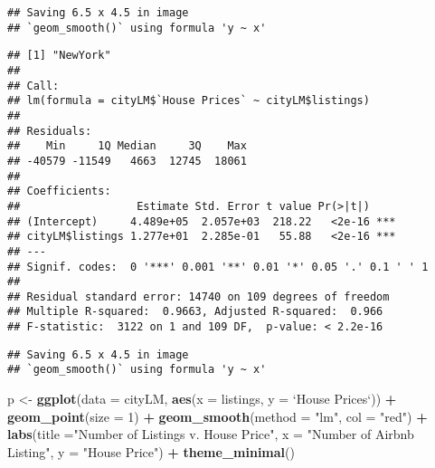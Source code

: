 \documentclass[
]{article}
\newenvironment{Shaded}{\begin{snugshade}}{\end{snugshade}}
\newcommand{\DataTypeTok}[1]{\textcolor[rgb]{0.13,0.29,0.53}{#1}}
\newcommand{\DecValTok}[1]{\textcolor[rgb]{0.00,0.00,0.81}{#1}}
\newcommand{\KeywordTok}[1]{\textcolor[rgb]{0.13,0.29,0.53}{\textbf{#1}}}
\newcommand{\NormalTok}[1]{#1}
\newcommand{\OperatorTok}[1]{\textcolor[rgb]{0.81,0.36,0.00}{\textbf{#1}}}
\newcommand{\StringTok}[1]{\textcolor[rgb]{0.31,0.60,0.02}{#1}}
\begin{document}
\begin{verbatim}
## Saving 6.5 x 4.5 in image
## `geom_smooth()` using formula 'y ~ x'
\end{verbatim}

\begin{verbatim}
## [1] "NewYork"
## 
## Call:
## lm(formula = cityLM$`House Prices` ~ cityLM$listings)
## 
## Residuals:
##    Min     1Q Median     3Q    Max 
## -40579 -11549   4663  12745  18061 
## 
## Coefficients:
##                  Estimate Std. Error t value Pr(>|t|)    
## (Intercept)     4.489e+05  2.057e+03  218.22   <2e-16 ***
## cityLM$listings 1.277e+01  2.285e-01   55.88   <2e-16 ***
## ---
## Signif. codes:  0 '***' 0.001 '**' 0.01 '*' 0.05 '.' 0.1 ' ' 1
## 
## Residual standard error: 14740 on 109 degrees of freedom
## Multiple R-squared:  0.9663, Adjusted R-squared:  0.966 
## F-statistic:  3122 on 1 and 109 DF,  p-value: < 2.2e-16
\end{verbatim}

\begin{verbatim}
## Saving 6.5 x 4.5 in image
## `geom_smooth()` using formula 'y ~ x'
\end{verbatim}

\begin{Shaded}
\begin{Highlighting}[]
\NormalTok{p <-}\StringTok{ }\KeywordTok{ggplot}\NormalTok{(}\DataTypeTok{data =}\NormalTok{ cityLM, }\KeywordTok{aes}\NormalTok{(}\DataTypeTok{x =}\NormalTok{ listings, }\DataTypeTok{y =} \StringTok{`}\DataTypeTok{House Prices}\StringTok{`}\NormalTok{)) }\OperatorTok{+}
\StringTok{  }\KeywordTok{geom_point}\NormalTok{(}\DataTypeTok{size =} \DecValTok{1}\NormalTok{) }\OperatorTok{+}
\StringTok{  }\KeywordTok{geom_smooth}\NormalTok{(}\DataTypeTok{method =} \StringTok{"lm"}\NormalTok{, }\DataTypeTok{col =} \StringTok{"red"}\NormalTok{) }\OperatorTok{+}
\StringTok{  }\KeywordTok{labs}\NormalTok{(}\DataTypeTok{title =}\StringTok{"Number of Listings v. House Price"}\NormalTok{, }\DataTypeTok{x =} \StringTok{"Number of Airbnb Listing"}\NormalTok{, }\DataTypeTok{y =} \StringTok{"House Price"}\NormalTok{) }\OperatorTok{+}
\StringTok{  }\KeywordTok{theme_minimal}\NormalTok{()}
\end{Highlighting}
\end{Shaded}
\end{document}
